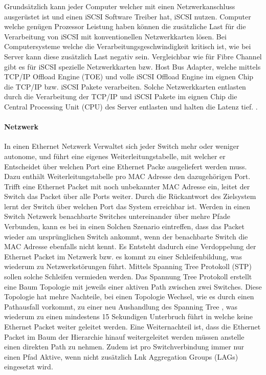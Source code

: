 Grundsätzlich kann jeder Computer welcher mit einen Netzwerkanschluss ausgerüstet ist und einen iSCSI Software Treiber hat, iSCSI nutzen. Computer welche genügen Prozessor Leistung haben können die zusätzliche Last für die Verarbeitung von iSCSI mit konventionellen Netzwerkkarten lösen. Bei Computersysteme welche die Verarbeitungsgeschwindigkeit kritisch ist, wie bei Server kann diese zusätzlich Last negativ sein. Vergleichbar wie für Fibre Channel gibt es für iSCSI spezielle Netzwerkkarten bzw. Host Bus Adapter, welche mittels TCP/IP Offload Engine (TOE) und volle iSCSI Offload Engine im eignen Chip die TCP/IP bzw. iSCSI Pakete verarbeiten. Solche Netzwerkkarten entlasten durch die Verarbeitung der TCP/IP und iSCSI Pakete im eignen Chip die Central Processing Unit (CPU) des Server entlasten und halten die Latenz tief. . 

\paragraph*{Netzwerk}
In einen Ethernet Netzwerk Verwaltet sich jeder Switch mehr oder weniger autonome, und führt eine eigenes Weiterleitungstabelle, mit welcher er Entscheidet über welchen Port eine Ethernet Packe ausgeliefert werden muss. Dazu enthält Weiterleitungstabelle pro MAC Adresse den dazugehörigen Port. Trifft eine Ethernet Packet mit noch unbekannter MAC Adresse ein, leitet der Switch das Packet über alle Ports weiter. Durch die Rückantwort des Zielsystem lernt der Switch über welchen Port das System erreichbar ist. Werden in einen Switch Netzwerk benachbarte Switches untereinander über mehre Pfade Verbunden, kann es bei in einen Solchen Szenario eintreffen, dass das Packet wieder am ursprünglichen Switch ankommt, wenn der benachbarte Switch die MAC Adresse ebenfalls nicht kennt. Es Entsteht dadurch eine Verdoppelung der Ethernet Packet im Netzwerk bzw. es kommt zu einer Schleifenbildung, was wiederum zu Netzwerkstörungen führt. Mittels Spanning Tree Protokoll (STP) sollen solche Schleifen vermieden werden. Das Spannung Tree Protokoll erstellt eine Baum Topologie mit jeweils einer aktiven Path zwischen zwei Switches. Diese Topologie hat mehre Nachteile, bei einen Topologie Wechsel, wie es durch einen Pathausfall vorkommt, zu einer neu Aushandlung des Spanning Tree  , was wiederum zu einen mindestens 15 Sekundigen Unterbruch führt in welche keine Ethernet Packet weiter geleitet werden. Eine Weiternachteil ist, dass die Ethernet Packet im Baum der Hierarchie hinauf weitergeleitet werden müssen anstelle einen direkten Path zu nehmen. Zudem ist pro Switchverbindung immer nur einen Pfad Aktive, wenn nicht zusätzlich Lnk Aggregation Groups (LAGs) eingesetzt wird.

